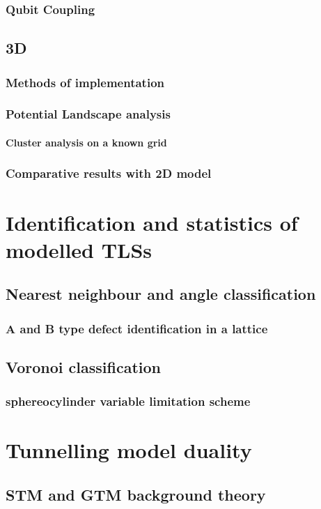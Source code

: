     \subsection{Qubit Coupling}
    \section{3D}
    \subsection{Methods of implementation}
    \subsection{Potential Landscape analysis}
    \subsubsection{Cluster analysis on a known grid}
    \subsection{Comparative results with 2D model}
    \chapter{Identification and statistics of modelled TLSs}
    \section{Nearest neighbour and angle classification}
    \subsection{A and B type defect identification in a lattice}
    \section{Voronoi classification}
    \subsection{sphereocylinder variable limitation scheme}
    \chapter{Tunnelling model duality}
    \section{STM and GTM background theory}
